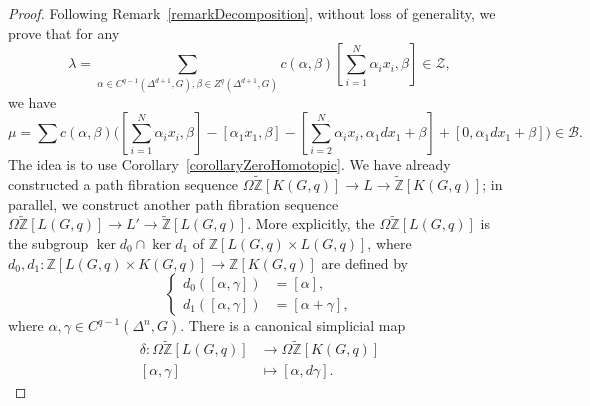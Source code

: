 \documentclass[reprint, amsmath, amssymb, showpacs, floatfix, longbibliography, aps, twocolumn, superscriptaddress, nofootinbib]{revtex4-2}
\newcommand{\ZZ}{{\mathbb Z}}
\newcommand{\tZ}{{\widetilde{\mathbb Z}}}
\theoremstyle{definition}
\begin{document}
\begin{proof}
	Following Remark~\ref{remarkDecomposition}, without loss of generality, we prove that for any
	\begin{equation}
		\lambda=\sum_{\alpha\in C^{q-1}(\Delta^{d+1},G),\beta\in Z^q(\Delta^{d+1},G)} c(\alpha,\beta)[\sum_{i=1}^N \alpha_ix_i,\beta]\in \mathcal{Z},
	\end{equation}
	we have
	\begin{equation}
		\mu=\sum c(\alpha,\beta)\bigg([\sum_{i=1}^N \alpha_ix_i,\beta]-[\alpha_1x_1,\beta]-[\sum_{i=2}^N \alpha_ix_i,\alpha_1dx_1+\beta]+[0,\alpha_1dx_1+\beta]\bigg)\in \mathcal{B}.
	\end{equation}
	The idea is to use Corollary~\ref{corollaryZeroHomotopic}. We have already constructed a path fibration sequence $\Omega\tZ[K(G,q)]\rightarrow L\rightarrow \tZ[K(G,q)]$; in parallel, we construct another path fibration sequence $\Omega\tZ[L(G,q)]\rightarrow L'\rightarrow \tZ[L(G,q)]$. More explicitly, the $\Omega\tZ[L(G,q)]$ is the subgroup $\ker d_0\cap \ker d_1$ of $\ZZ[L(G,q)\times L(G,q)]$, where 
	$d_0,d_1:\ZZ[L(G,q)\times K(G,q)]\rightarrow \ZZ[K(G,q)]$ are defined by
	\begin{equation}
		\left\{
		\begin{aligned}
			d_0([\alpha,\gamma]) &= [\alpha],\\
			d_1([\alpha,\gamma]) &= [\alpha+\gamma],
		\end{aligned}
		\right.
	\end{equation}
	where $\alpha,\gamma\in C^{q-1}(\Delta^n,G)$. There is a canonical simplicial map
	\begin{equation}
		\begin{aligned}
			\delta : \Omega\tZ[L(G,q)]&\rightarrow \Omega\tZ[K(G,q)]\\
			[\alpha,\gamma]&\mapsto[\alpha,d\gamma].
		\end{aligned}		
	\end{equation}
	

\end{proof}
\end{document}
